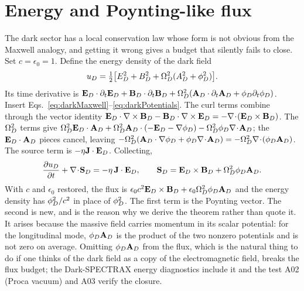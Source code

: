 \section{Energy and Poynting-like flux}\label{sec:energy}

The dark sector has a local conservation law whose form is not obvious from the Maxwell analogy, and getting it wrong gives a budget that silently fails to close. Set $c=\epsilon_0=1$. Define the energy density of the dark field
\begin{equation}
u_D=\tfrac12\big[E_D^2+B_D^2+\Omega_D^2(A_D^2+\phi_D^2)\big] .\label{eq:uD}
\end{equation}
Its time derivative is $\mathbf E_D\cdot\partial_t\mathbf E_D+\mathbf B_D\cdot\partial_t\mathbf B_D+\Omega_D^2(\mathbf A_D\cdot\partial_t\mathbf A_D+\phi_D\partial_t\phi_D)$. Insert Eqs.~\eqref{eq:darkMaxwell}--\eqref{eq:darkPotentials}. The curl terms combine through the vector identity $\mathbf E_D\cdot\nabla\times\mathbf B_D-\mathbf B_D\cdot\nabla\times\mathbf E_D=-\nabla\!\cdot\!(\mathbf E_D\times\mathbf B_D)$. The $\Omega_D^2$ terms give $\Omega_D^2\mathbf E_D\cdot\mathbf A_D+\Omega_D^2\mathbf A_D\cdot(-\mathbf E_D-\nabla\phi_D)-\Omega_D^2\phi_D\nabla\!\cdot\!\mathbf A_D$; the $\mathbf E_D\cdot\mathbf A_D$ pieces cancel, leaving $-\Omega_D^2(\mathbf A_D\cdot\nabla\phi_D+\phi_D\nabla\!\cdot\!\mathbf A_D)=-\Omega_D^2\nabla\!\cdot\!(\phi_D\mathbf A_D)$. The source term is $-\eta\mathbf J\cdot\mathbf E_D$. Collecting,
\begin{equation}
\frac{\partial u_D}{\partial t}+\nabla\!\cdot\!\mathbf S_D=-\eta\,\mathbf J\cdot\mathbf E_D ,\qquad \mathbf S_D=\mathbf E_D\times\mathbf B_D+\Omega_D^2\phi_D\mathbf A_D .\label{eq:poyntingD}
\end{equation}
With $c$ and $\epsilon_0$ restored, the flux is $\epsilon_0c^2\mathbf E_D\times\mathbf B_D+\epsilon_0\Omega_D^2\phi_D\mathbf A_D$ and the energy density has $\phi_D^2/c^2$ in place of $\phi_D^2$. The first term is the Poynting vector. The second is new, and is the reason why we derive the theorem rather than quote it. It arises because the massive field carries momentum in its scalar potential: for the longitudinal mode, $\phi_D\mathbf A_D$ is the product of the two nonzero potentials and is not zero on average. Omitting $\phi_D\mathbf A_D$ from the flux, which is the natural thing to do if one thinks of the dark field as a copy of the electromagnetic field, breaks the flux budget; the Dark-SPECTRAX energy diagnostics include it and the test A02 (Proca vacuum) and A03 verify the closure.

